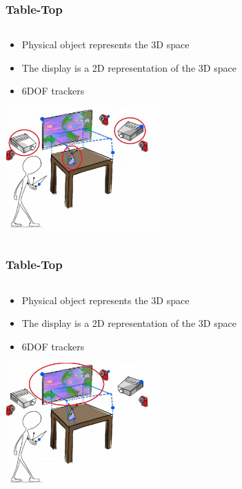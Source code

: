 \documentclass{beamer}
\begin{document}
\begin{frame}
\frametitle{Table-Top} 
	\begin{columns}
    \begin{column}{0.9\textwidth}
    \begin{itemize}
		\item Physical object represents the 3D space
		\item The display is a 2D representation of the 3D space
		\item 6DOF trackers
	\end{itemize}
	
	\begin{center}
	\includegraphics[width=6cm]{images/TabletopPO}
	
	\cite{3D}
	\end{center}
	\end{column}
    \end{columns}
\end{frame}

\begin{frame}
\frametitle{Table-Top} 
	\begin{columns}
    \begin{column}{0.9\textwidth}
    \begin{itemize}
		\item Physical object represents the 3D space
		\item The display is a 2D representation of the 3D space
		\item 6DOF trackers
	\end{itemize}
	
	\begin{center}
	\includegraphics[width=6cm]{images/TabletopDis}
	
	\cite{3D}
	\end{center}
	\end{column}
    \end{columns}
\end{frame}
\end{document}
